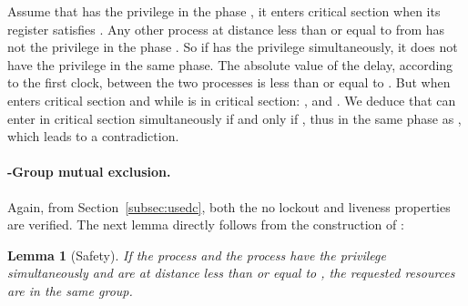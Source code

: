 \documentclass[11pt]{article}
\newenvironment{proof}{{\bf Proof. } }{{\hfill }\vspace{.5pc}}
\newtheorem{lemma}[theorem]{Lemma}
\begin{document}
\begin{proof}
Assume that  has the privilege in the phase , 
 it enters critical section  when its register  satisfies . 
Any other process  at distance less than or equal to  from  has not the privilege in the phase 
.  So if  has the
privilege simultaneously, it does not have the privilege in the same phase. The absolute value of the delay,
according to the first clock, between the two processes is less than or equal to .  But when  enters critical section and while  is in critical section:
 , 
and .
 We deduce that  can enter in critical section simultaneously if and only if , thus in the same phase as , which leads to a
contradiction. 
\end{proof}



\paragraph{-Group mutual exclusion.} 

Again, from Section~\ref{subsec:usedc}, both the no lockout and liveness properties are verified. 
The next lemma directly follows from the construction of :
\begin{lemma}[Safety]
If the process  and the process  have the privilege simultaneously and are at distance less than or equal to ,
the requested resources are in the same group.
\end{lemma}
\end{document}
